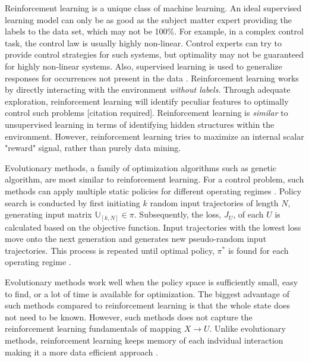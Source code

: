 Reinforcement learning is a unique class of machine learning.  An ideal supervised learning model can only be as good as the subject matter expert providing the labels to the data set, which may not be 100\%.  For example, in a complex control task, the control law is usually highly non-linear. Control experts can try to provide control strategies for such systems, but optimality may not be guaranteed for highly non-linear systems. Also, supervised learning is used to generalize responses for occurrences not present in the data \cite{sutton}.  Reinforcement learning works by directly interacting with the environment \textit{without labels}. Through adequate exploration, reinforcement learning will identify peculiar features to optimally control such problems [citation required].  Reinforcement learning is \textit{similar} to unsupervised learning in terms of identifying hidden structures within the environment.  However, reinforcement learning tries to maximize an internal scalar "reward" signal, rather than purely data mining.

Evolutionary methods, a family of optimization algorithms such as genetic algorithm, are most similar to reinforcement learning.  For a control problem, such methods can apply multiple static policies for different operating regimes \cite{sutton}.  Policy search is conducted by first initiating $k$ random input trajectories of length $N$, generating input matrix $\mathbb{U}_{[k, N]} \in \pi$.  Subsequently, the loss, $J_U$, of each $U$ is calculated based on the objective function.  Input trajectories with the lowest loss move onto the next generation and generates new pseudo-random input trajectories.  This process is repeated until optimal policy, $\pi^*$ is found for each operating regime \cite{ga_for_control}.

Evolutionary methods work well when the policy space is sufficiently small, easy to find, or a lot of time is available for optimization.  The biggest advantage of such methods compared to reinforcement learning is that the whole state does not need to be known.  However, such methods does not capture the reinforcement learning fundamentals of mapping $X \rightarrow U$.  Unlike evolutionary methods, reinforcement learning keeps memory of each indvidual interaction making it a more data efficient approach \cite{sutton}.




